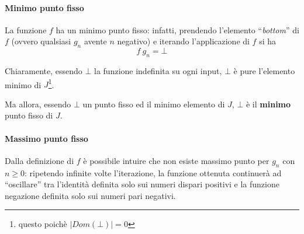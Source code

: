 \paragraph{Minimo punto fisso}
La funzione $f$ ha un minimo punto fisso: infatti, prendendo l'elemento
``\textit{bottom}'' di $f$ (ovvero qualsiasi $g_n$ avente $n$ negativo) e
iterando l'applicazione di $f$ si ha
$$
f\ g_n = \bot
$$

Chiaramente, essendo $\bot$ la funzione indefinita su ogni input, $\bot$ è pure
l'elemento minimo di $J$\footnote{questo poichè $|Dom(\bot)| = 0$}.

Ma allora, essendo $\bot$ un punto fisso ed il minimo elemento di $J$, $\bot$ è
il \textbf{minimo} punto fisso di $J$.

\paragraph{Massimo punto fisso} Dalla definizione di $f$ è possibile intuire
che non esiste massimo punto per $g_n$ con $n \geq 0$: ripetendo infinite volte
l'iterazione, la funzione ottenuta continuerà ad ``oscillare'' tra l'identità
definita solo sui numeri dispari positivi e la funzione negazione definita solo
sui numeri pari negativi.

\let\lt\undefined
